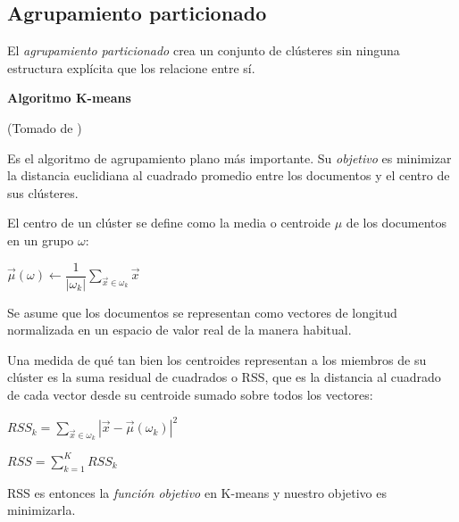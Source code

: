 \documentclass{llncs}
\begin{document}
\subsection{Agrupamiento particionado}

El \textit{agrupamiento particionado} crea un conjunto  de clústeres sin ninguna estructura explícita que los relacione entre sí. 

\vspace{1em}
\textbf{Algoritmo K-means}
\begin{flushright}
	\scriptsize*(Tomado de \cite{B1})
	\normalsize
\end{flushright}
\vspace{0.5em}

	Es el algoritmo de agrupamiento plano más importante. Su \textit{objetivo} es minimizar la distancia euclidiana al cuadrado promedio entre los documentos y el centro de sus cl\'usteres. 
	
	El centro de un cl\'uster se define como la media o centroide $\mu$ de los documentos en un grupo $\omega$:
	
	\begin{center}
		$ \overrightarrow{\mu}(\omega) \leftarrow \dfrac{1}{|\omega_{k}|} \sum_{\overrightarrow{x} \in \omega_{k}} \overrightarrow{x} $
	\end{center}
	
	Se asume que los documentos se representan como vectores de longitud normalizada  en un espacio de valor real de la manera habitual.  
	
	Una medida de qué tan bien los centroides representan a los miembros de su cl\'uster es la suma residual de cuadrados o RSS, que es la distancia al cuadrado de cada vector desde su centroide sumado sobre todos los vectores:
	
	\begin{center}
		$ RSS_{k} = \sum_{\overrightarrow{x} \in \omega_{k}}|\overrightarrow{x} - \overrightarrow{\mu}(\omega_{k})|^2$
	
	\vspace{1em}
	$ RSS = \sum_{k=1}^{K} RSS_{k} $
	\end{center}

	RSS es entonces la \textit{función objetivo} en K-means y nuestro objetivo es minimizarla.
	
\end{document}
